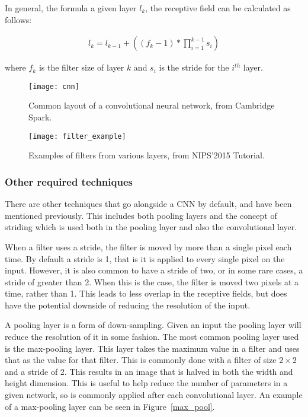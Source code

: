 In general, the formula a given layer $l_k$, the receptive field can be
calculated as follows:

\begin{align}
    l_k = l_{k-1} + ((f_k - 1) * \prod_{i=1}^{k-1}s_i)
\end{align}

where $f_k$ is the filter size of layer $k$ and $s_i$ is the stride for the
$i^{th}$ layer.


\begin{figure}
    \centering
    \texttt{[image: cnn]}
    \caption{Common layout of a convolutional neural network, from
    Cambridge Spark\cite{cnn-layout}.}%
    \label{fig:cnn}
\end{figure}

\begin{figure}
    \centering
    \texttt{[image: filter\_example]}
    \caption{Examples of filters from various layers, from
    NIPS'2015 Tutorial\cite{filterexample}.}%
    \label{fig:filter_example}
\end{figure}

\subsubsection{Other required techniques}

There are other techniques that go alongside a CNN by default, and have been
mentioned previously. This includes both pooling layers and the concept of
striding which is used both in the pooling layer and also the convolutional
layer.

When a filter uses a stride, the filter is moved by more than a single pixel
each time. By default a stride is 1, that is it is applied to every single pixel
on the input. However, it is also common to have a stride of two, or in some
rare cases, a stride of greater than 2. When this is the case, the filter
is moved two pixels at a time, rather than 1. This leads to less overlap in the
receptive fields, but does have the potential downside of reducing the
resolution of the input.

A pooling layer is a form of down-sampling. Given an input the pooling layer
will reduce the resolution of it in some fashion. The most common pooling layer
used is the max-pooling layer. This layer takes the maximum value in a filter
and uses that as the value for that filter. This is commonly done with a filter
of size $2 \times 2$ and a stride of 2. This results in an image that is halved
in both the width and height dimension. This is useful to help reduce the number
of parameters in a given network, so is commonly applied after each
convolutional layer. An example of a max-pooling layer can be seen in
Figure~\ref{max_pool}.

